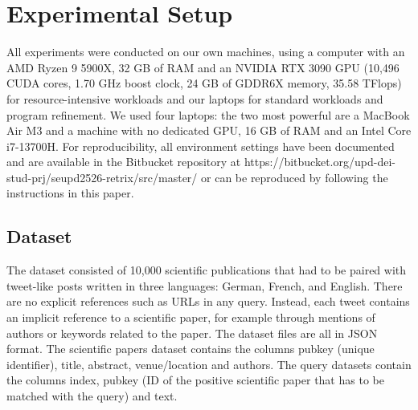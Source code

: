 \section{Experimental Setup}
\label{sec:setup}
All experiments were conducted on our own machines, using a computer with an AMD Ryzen 9 5900X, 32 GB of RAM and an NVIDIA RTX 3090 GPU (10,496 CUDA cores, 1.70 GHz boost clock, 24 GB of GDDR6X memory, 35.58 TFlops) for resource-intensive workloads and our laptops for standard workloads and program refinement. We used four laptops: the two most powerful are a MacBook Air M3 and a machine with no dedicated GPU, 16 GB of RAM and an Intel Core i7-13700H.
For reproducibility, all environment settings have been documented and are available in the Bitbucket repository at https://bitbucket.org/upd-dei-stud-prj/seupd2526-retrix/src/master/ or can be reproduced by following the instructions in this paper.

\subsection{Dataset}
\label{sec:dataset}

The dataset consisted of 10,000 scientific publications that had to be paired with tweet-like posts written in three languages: German, French, and English. There are no explicit references such as URLs in any query. Instead, each tweet contains an implicit reference to a scientific paper, for example through mentions of authors or keywords related to the paper. The dataset files are all in JSON format. The scientific papers dataset contains the columns pubkey (unique identifier), title, abstract, venue/location and authors. The query datasets contain the columns index, pubkey (ID of the positive scientific paper that has to be matched with the query) and text.


